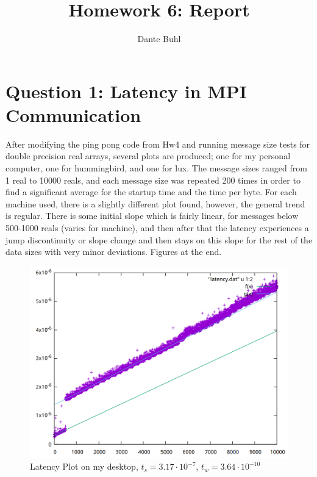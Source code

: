 \documentclass{article}
\title{Homework 6: Report}
\author{Dante Buhl}
\begin{document}
\newcommand{\bs}[1]{\boldsymbol{#1}}
\newcommand{\bmp}[1]{\begin{minipage}{#1\textwidth}}
\newcommand{\emp}{\end{minipage}}
\newcommand{\R}{\mathbb{R}}
\newcommand{\C}{\mathbb{C}}
\newcommand{\N}{\mathcal{N}}
\newcommand{\I}{\mathrm{I}}
\newcommand{\K}{\bs{\mathrm{K}}}
\newcommand{\m}{\bs{\mu}_*}
\newcommand{\s}{\bs{\Sigma}_*}
\newcommand{\dt}{\Delta t}
\newcommand{\tr}[1]{\text{Tr}(#1)}
\newcommand{\Tr}[1]{\text{Tr}(#1)}

\maketitle

\section*{Question 1: Latency in MPI Communication}

    After modifying the ping pong code from Hw4 and running message size tests
    for double precision real arrays, several plots are produced; one for my personal
    computer, one for hummingbird, and one for lux. The message sizes ranged
    from 1 real to 10000 reals, and each message size was repeated 200 times in
    order to find a significant average for the startup time and the time per
    byte. For each machine used, there is a slightly different plot found,
    however, the general trend is regular. There is some initial slope which is
    fairly linear, for messages below 500-1000 reals (varies for machine), and
    then after that the latency experiences a jump discontinuity or slope
    change and then stays on this slope for the rest of the data sizes with very
    minor deviations. Figures at the end.

    \begin{figure}
        \centering
        \includegraphics[width=.8\textwidth]{personallatency.png}
        \caption{Latency Plot on my desktop, $t_s = 3.17\cdot10^{-7}$, $t_w =
        3.64\cdot10^{-10}$}
    \end{figure}
\end{document}
